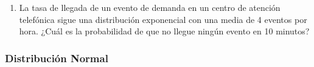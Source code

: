 \begin{Ejer}
\begin{enumerate}
    \item La tasa de llegada de un evento de demanda en un centro de atención telefónica sigue una distribución exponencial con una media de 4 eventos por hora. ¿Cuál es la probabilidad de que no llegue ningún evento en 10 minutos?


\end{enumerate}

\end{Ejer}



\subsubsection{Distribución Normal}

